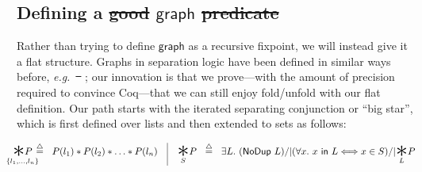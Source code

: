 \documentclass[acmsmall,screen]{acmart}  %
\newcommand\hide[1]{}
\newcommand{\defeq}{\mathbin{\stackrel{\triangle}{=}}} %
\newcommand{\p}[1]{\ensuremath{\mathsf{#1}}} \newcommand{\m}[1]{\ensuremath{\mathit{#1}}} \newcommand{\ma}[1]{\ensuremath{\mathcal{#1}}} \let\ramify\lightning
\providecommand{\DIFadd}[1]{{\protect\color{blue}\uwave{#1}}} %
\providecommand{\DIFdel}[1]{{\protect\color{red}\sout{#1}}}                      %
\providecommand{\DIFaddbegin}{} %
\providecommand{\DIFaddend}{} %
\providecommand{\DIFdelbegin}{} %
\providecommand{\DIFdelend}{} %
\newcommand{\DIFscaledelfig}{0.5}
\newlength{\DIFdelgraphicswidth} %
\newlength{\DIFdelgraphicsheight} %
\newcommand{\DIFaddincludegraphics}[2][]{{\color{blue}\fbox{\DIFOincludegraphics[#1]{#2}}}} %
\newcommand{\DIFdelincludegraphics}[2][]{%
\sbox{\DIFdelgraphicsbox}{\DIFOincludegraphics[#1]{#2}}%
\settoboxwidth{\DIFdelgraphicswidth}{\DIFdelgraphicsbox} %
\settoboxtotalheight{\DIFdelgraphicsheight}{\DIFdelgraphicsbox} %
\scalebox{\DIFscaledelfig}{%
\parbox[b]{\DIFdelgraphicswidth}{\usebox{\DIFdelgraphicsbox}\\[-\baselineskip] \rule{\DIFdelgraphicswidth}{0em}}\llap{\resizebox{\DIFdelgraphicswidth}{\DIFdelgraphicsheight}{%
\setlength{\unitlength}{\DIFdelgraphicswidth}%
\begin{picture}(1,1)%
\thicklines\linethickness{2pt} %
{\color[rgb]{1,0,0}\put(0,0){\framebox(1,1){}}}%
{\color[rgb]{1,0,0}\put(0,0){\line( 1,1){1}}}%
{\color[rgb]{1,0,0}\put(0,1){\line(1,-1){1}}}%
\end{picture}%
}\hspace*{3pt}}} %
} %
\DeclareRobustCommand{\DIFaddbegin}{\DIFOaddbegin \let\includegraphics\DIFaddincludegraphics} %
\DeclareRobustCommand{\DIFaddend}{\DIFOaddend \let\includegraphics\DIFOincludegraphics} %
\DeclareRobustCommand{\DIFdelbegin}{\DIFOdelbegin \let\includegraphics\DIFdelincludegraphics} %
\DeclareRobustCommand{\DIFdelend}{\DIFOaddend \let\includegraphics\DIFOincludegraphics} %
\begin{document}
\hide{
\section{Difficulty using $\graphkt$}
\label{apx:problemrecgraph}


See Figure \ref{fig:badcycle} for an attempt to prove the entailment $100 |-> 42,100,0 ~ |- ~ \graphkt(100,\hat{\gamma})$.  Part of the problem is that the recursive structure interacts very badly with $**$: if the recursion involved~$*$~then it \textbf{would} be provable, by induction on the finite memory (each ``recursive call'' would be on a strictly smaller subheap).  This is why Knaster-Tarski works so well with list, tree, and DAG predicates in separation logic.
}












\DIFaddend \subsection{\texorpdfstring{Defining a \DIFdelbegin \DIFdel{good }\DIFdelend \DIFaddbegin \DIFadd{Good }\DIFaddend \p{graph} \DIFdelbegin \DIFdel{predicate}\DIFdelend \DIFaddbegin \DIFadd{Predicate}\DIFaddend}{XXX} }\label{sec:goodgraph}

Rather than trying to define \p{graph} as a recursive fixpoint,
we will instead give it a flat structure.  Graphs in separation
logic have been defined in similar ways before, \emph{e.g.}~\DIFdelbegin \DIFdel{\mbox{%
\cite{ilya-graphs}}\hspace{0pt}%
}\DIFdelend \DIFaddbegin \DIFadd{\mbox{%
\citet{ilya-graphs}}\hspace{0pt}%
}\DIFaddend ;
our innovation is that we prove---with the amount of precision
required to convince Coq---that we can still enjoy fold/unfold
with our flat definition.  Our path starts with the iterated
separating conjunction or ``big star'', which is first defined over
lists and then extended to sets as follows:

\vspace{-1em}
\[
\DIFdelbegin %
\DIFdelend \DIFaddbegin \begin{array}{@{}l@{}}
\!\!\!\!\!\!\!\underset{\{l_1,\dots,l_n\}}{\bigstar P}\!\!\!\!\!\!\! ~~ \defeq ~~ P(l_1) *
  P(l_2) * \dots * P(l_n) \quad \vline \quad
\underset{S}{\bigstar} P ~~ \defeq ~~ \exists L.~ (\p{NoDup}\ L) /| (\forall x.~ x\ \p{in}\ L <=> x \in S) /| \underset{L}{\bigstar}P
\end{array}
\DIFaddend \]
\end{document}
